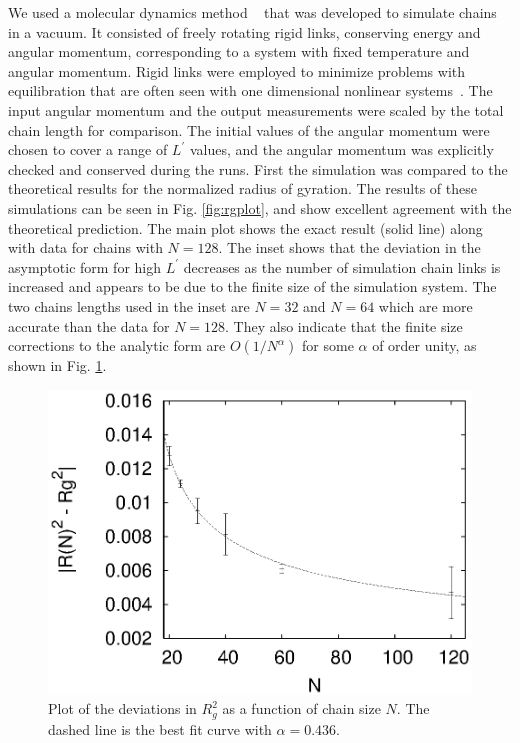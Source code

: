 \documentclass[11pt]{ucthesis}
\begin{document}
We used a molecular dynamics method ~\cite{DeutschCerf} that was developed to simulate chains in a vacuum. It
consisted of freely rotating rigid links, conserving energy and angular
momentum, corresponding to a system with fixed temperature and angular momentum. Rigid links were employed to minimize problems with equilibration that are often seen with one dimensional nonlinear systems~\cite{FPU,BermanIzrailev}. The input angular momentum and the output measurements were
scaled by the total chain length for comparison. The initial values of
the angular momentum were chosen to cover a range of $L^\prime$ values, and the
angular momentum was explicitly checked and conserved during the runs.
First the simulation was compared to the theoretical results for the
normalized radius of gyration. The results of these simulations can be
seen in Fig. \ref{fig:rgplot}, and show excellent agreement with the
theoretical prediction. The main plot shows the exact result (solid line)
along with data for chains with $N=128$. The inset shows that the deviation in the asymptotic form for high
$L^\prime$ decreases as the number of simulation chain links is increased and
appears to be due to the finite size of the simulation system. The two chains lengths
used in the inset are $N=32$ and $N=64$ which are more accurate than the data
for $N=128$. They also indicate that the finite size corrections to the
analytic form are $O(1/N^\alpha)$ for some $\alpha$ of order unity, as shown in Fig. \ref{fig:scalen}.
\begin{figure}
\begin{center}
\includegraphics[width=\hsize]{scalen}
\caption{Plot of the deviations in $R_g^2$ as a function of chain size $N$. The dashed line is the best fit curve with $\alpha = 0.436$.}
\label{fig:scalen}
\end{center}
\end{figure}
\end{document}
